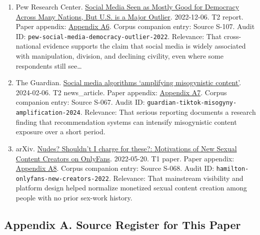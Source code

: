 \documentclass[
  american,
  11pt,
  letterpaper,
]{article}
\begin{document}
\begin{enumerate}
{  For Kids: Investigating TikTok's Under 13 Experience}. 2025-06-30. T1
  paper. Paper appendix:
  \hyperref[appendix-a5-when-kids-mode-isn-t-for-kids-investigating-tiktok-s-under-13-experience]{Appendix
  A5}. Corpus companion entry: Source S-118. Audit ID:
  \texttt{tiktok-kids-mode-2025}. Relevance: That a child-directed
  platform mode can still expose minors to content that the researchers
  did not classify as child-directed.
\item
  Pew Research Center.
  \href{https://www.pewresearch.org/global/2022/12/06/social-media-seen-as-mostly-good-for-democracy-across-many-nations-but-u-s-is-a-major-outlier/}{Social
  Media Seen as Mostly Good for Democracy Across Many Nations, But U.S.
  is a Major Outlier}. 2022-12-06. T2 report. Paper appendix:
  \hyperref[appendix-a6-social-media-seen-as-mostly-good-for-democracy-across-many-nations-but-u-s-is-a-major-outlier]{Appendix
  A6}. Corpus companion entry: Source S-107. Audit ID:
  \texttt{pew-social-media-democracy-outlier-2022}. Relevance: That
  cross-national evidence supports the claim that social media is widely
  associated with manipulation, division, and declining civility, even
  where some respondents still see\ldots{}
\item
  The Guardian.
  \href{https://www.theguardian.com/media/2024/feb/06/social-media-algorithms-amplifying-misogynistic-content}{Social
  media algorithms `amplifying misogynistic content'}. 2024-02-06. T2
  news\_article. Paper appendix:
  \hyperref[appendix-a7-social-media-algorithms-amplifying-misogynistic-content]{Appendix
  A7}. Corpus companion entry: Source S-067. Audit ID:
  \texttt{guardian-tiktok-misogyny-amplification-2024}. Relevance: That
  serious reporting documents a research finding that recommendation
  systems can intensify misogynistic content exposure over a short
  period.
\item
  arXiv. \href{https://arxiv.org/abs/2205.10425}{Nudes? Shouldn't I
  charge for these?: Motivations of New Sexual Content Creators on
  OnlyFans}. 2022-05-20. T1 paper. Paper appendix:
  \hyperref[appendix-a8-nudes-shouldn-t-i-charge-for-these-motivations-of-new-sexual-content-creators-on-onlyfans]{Appendix
  A8}. Corpus companion entry: Source S-068. Audit ID:
  \texttt{hamilton-onlyfans-new-creators-2022}. Relevance: That
  mainstream visibility and platform design helped normalize monetized
  sexual content creation among people with no prior sex-work history.
\end{enumerate}

\subsection{Appendix A. Source Register for This
Paper}\label{appendix-a.-source-register-for-this-paper}
\end{document}
